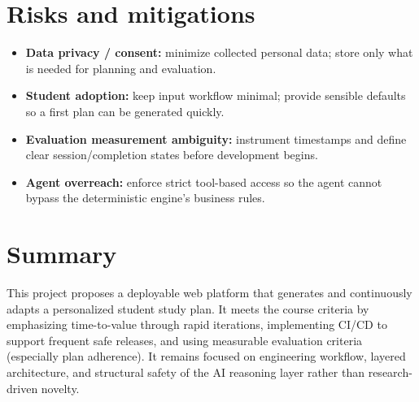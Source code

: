 \documentclass[11pt,a4paper]{article}
\begin{document}
\section{Risks and mitigations}
\begin{itemize}[leftmargin=0.7cm]
    \item \textbf{Data privacy / consent:} minimize collected personal data; store only what is needed for planning and evaluation.
    \item \textbf{Student adoption:} keep input workflow minimal; provide sensible defaults so a first plan can be generated quickly.
    \item \textbf{Evaluation measurement ambiguity:} instrument timestamps and define clear session/completion states before development begins.
    \item \textbf{Agent overreach:} enforce strict tool-based access so the agent cannot bypass the deterministic engine's business rules.
\end{itemize}

\section{Summary}
This project proposes a deployable web platform that generates and
continuously adapts a personalized student study plan. It meets the
course criteria by emphasizing time-to-value through rapid
iterations, implementing CI/CD to support frequent safe releases,
and using measurable evaluation criteria (especially plan
adherence). It remains focused on engineering workflow, layered
architecture, and structural safety of the AI reasoning layer rather
than research-driven novelty.
\end{document}
